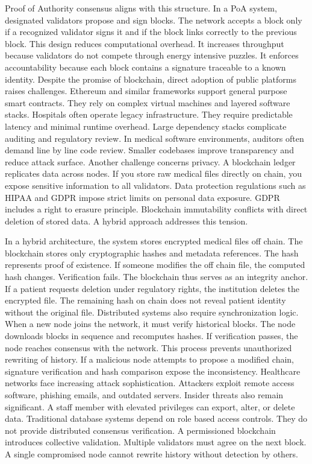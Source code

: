 Proof of Authority consensus aligns with this structure. In a PoA system, designated validators propose and sign blocks. The network accepts a block only if a recognized validator signs it and if the block links correctly to the previous block. This design reduces computational overhead. It increases throughput because validators do not compete through energy intensive puzzles. It enforces accountability because each block contains a signature traceable to a known identity.
Despite the promise of blockchain, direct adoption of public platforms raises challenges. Ethereum and similar frameworks support general purpose smart contracts. They rely on complex virtual machines and layered software stacks. Hospitals often operate legacy infrastructure. They require predictable latency and minimal runtime overhead. Large dependency stacks complicate auditing and regulatory review. In medical software environments, auditors often demand line by line code review. Smaller codebases improve transparency and reduce attack surface.
Another challenge concerns privacy. A blockchain ledger replicates data across nodes. If you store raw medical files directly on chain, you expose sensitive information to all validators. Data protection regulations such as HIPAA and GDPR impose strict limits on personal data exposure. GDPR includes a right to erasure principle. Blockchain immutability conflicts with direct deletion of stored data. A hybrid approach addresses this tension.
\par
\noindent\hspace*{2em}In a hybrid architecture, the system stores encrypted medical files off chain. The blockchain stores only cryptographic hashes and metadata references. The hash represents proof of existence. If someone modifies the off chain file, the computed hash changes. Verification fails. The blockchain thus serves as an integrity anchor. If a patient requests deletion under regulatory rights, the institution deletes the encrypted file. The remaining hash on chain does not reveal patient identity without the original file.
Distributed systems also require synchronization logic. When a new node joins the network, it must verify historical blocks. The node downloads blocks in sequence and recomputes hashes. If verification passes, the node reaches consensus with the network. This process prevents unauthorized rewriting of history. If a malicious node attempts to propose a modified chain, signature verification and hash comparison expose the inconsistency.
Healthcare networks face increasing attack sophistication. Attackers exploit remote access software, phishing emails, and outdated servers. Insider threats also remain significant. A staff member with elevated privileges can export, alter, or delete data. Traditional database systems depend on role based access controls. They do not provide distributed consensus verification. A permissioned blockchain introduces collective validation. Multiple validators must agree on the next block. A single compromised node cannot rewrite history without detection by others.

